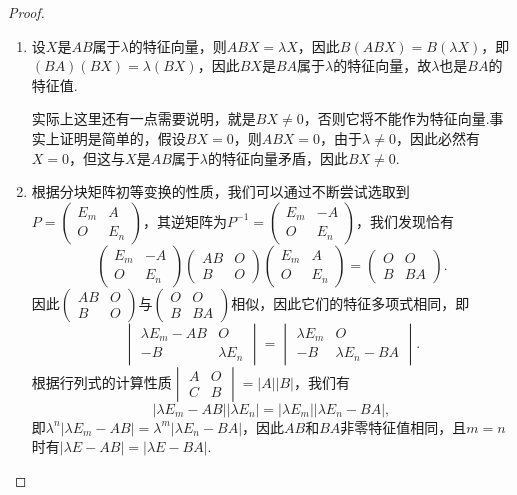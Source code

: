 \begin{proof}
    \begin{enumerate}
        \item 设$X$是$AB$属于$\lambda$的特征向量，则$ABX=\lambda X$，因此$B(ABX)=B(\lambda X)$，即$(BA)(BX)=\lambda(BX)$，因此$BX$是$BA$属于$\lambda$的特征向量，故$\lambda$也是$BA$的特征值.

        实际上这里还有一点需要说明，就是$BX\neq 0$，否则它将不能作为特征向量.事实上证明是简单的，假设$BX=0$，则$ABX=0$，由于$\lambda\neq 0$，因此必然有$X=0$，但这与$X$是$AB$属于$\lambda$的特征向量矛盾，因此$BX\neq 0$.

        \item 根据分块矩阵初等变换的性质，我们可以通过不断尝试选取到$P=\begin{pmatrix}
            E_m & A \\ O & E_n
        \end{pmatrix}$，其逆矩阵为$P^{-1}=\begin{pmatrix}
            E_m & -A \\ O & E_n
        \end{pmatrix}$，我们发现恰有
        \[\begin{pmatrix}
            E_m & -A \\ O & E_n
        \end{pmatrix}\begin{pmatrix}
            AB & O \\ B & O
        \end{pmatrix}\begin{pmatrix}
            E_m & A \\ O & E_n
        \end{pmatrix}=\begin{pmatrix}
            O & O \\ B & BA
        \end{pmatrix}.\]
        因此$\begin{pmatrix}
            AB & O \\ B & O
        \end{pmatrix}$与$\begin{pmatrix}
            O & O \\ B & BA
        \end{pmatrix}$相似，因此它们的特征多项式相同，即
        \[\begin{vmatrix}
            \lambda E_m-AB & O \\ -B & \lambda E_n
        \end{vmatrix}=\begin{vmatrix}
            \lambda E_m & O \\ -B & \lambda E_n-BA
        \end{vmatrix}.\]
        根据行列式的计算性质$\begin{vmatrix}
            A & O \\ C & B
        \end{vmatrix}=|A||B|$，我们有
        \[|\lambda E_m-AB||\lambda E_n|=|\lambda E_m||\lambda E_n-BA|,\]
        即$\lambda^n|\lambda E_m-AB|=\lambda^m|\lambda E_n-BA|$，因此$AB$和$BA$非零特征值相同，且$m=n$时有$|\lambda E-AB|=|\lambda E-BA|$.
    \end{enumerate}
\end{proof}

